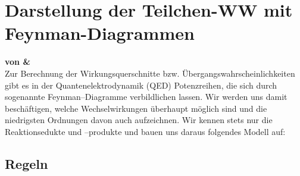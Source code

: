 \documentclass[Ex4_Zusammenfassung.tex]{subfiles}
\begin{document}
\section{Darstellung der Teilchen-WW mit Feynman-Diagrammen}
\textbf{von \soeren \& \martina}\\

Zur Berechnung der Wirkungsquerschnitte bzw. Übergangswahrscheinlichkeiten gibt es in der Quantenelektrodynamik (QED) Potenzreihen, die sich durch sogenannte Feynman--Diagramme verbildlichen lassen. Wir werden uns damit beschäftigen, welche Wechselwirkungen überhaupt möglich sind und die niedrigsten Ordnungen davon auch aufzeichnen. Wir kennen stets nur die Reaktionsedukte und --produkte und bauen uns daraus folgendes Modell auf:  

\subsection{Regeln}
	
\end{document}
